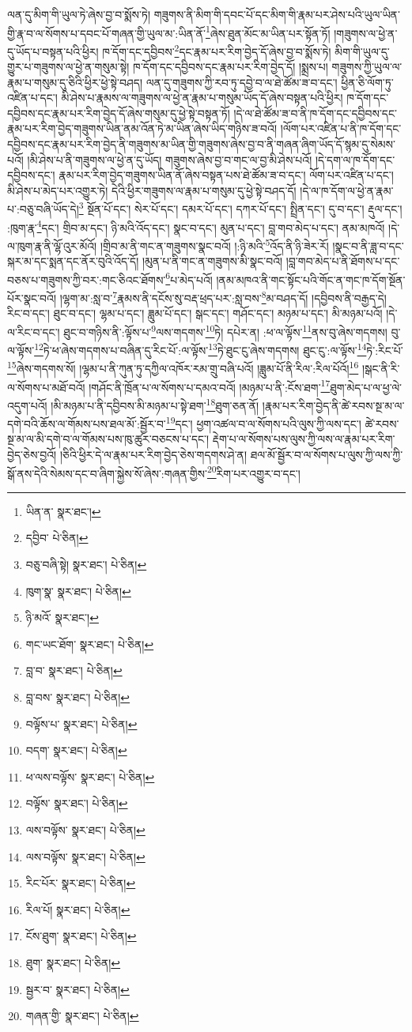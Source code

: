 ལན་དུ་མིག་གི་ཡུལ་ཏེ་ཞེས་བྱ་བ་སྨོས་ཏེ། གཟུགས་ནི་མིག་གི་དབང་པོ་དང་མིག་གི་རྣམ་པར་ཤེས་པའི་ཡུལ་ཡིན་གྱི་རྣ་བ་ལ་སོགས་པ་དབང་པོ་གཞན་གྱི་ཡུལ་མ་:ཡིན་ནོ་\footnote{ཡིན་ན་  སྣར་ཐང་། }ཞེས་ཐུན་མོང་མ་ཡིན་པར་སྟོན་ཏོ། །གཟུགས་ལ་ཕྱེ་ན་དུ་ཡོད་པ་བསྟན་པའི་ཕྱིར། ཁ་དོག་དང་དབྱིབས་\footnote{དབྱིབ་  པེ་ཅིན། }དང་རྣམ་པར་རིག་བྱེད་དོ་ཞེས་བྱ་བ་སྨོས་ཏེ། མིག་གི་ཡུལ་དུ་གྱུར་པ་གཟུགས་ལ་ཕྱེ་ན་གསུམ་སྟེ། ཁ་དོག་དང་དབྱིབས་དང་རྣམ་པར་རིག་བྱེད་དོ། །སྨྲས་པ། གཟུགས་ཀྱི་ཡུལ་ལ་རྣམ་པ་གསུམ་དུ་ཅིའི་ཕྱིར་ཕྱེ་སྟེ་བཤད། ལན་དུ་གཟུགས་ཀྱི་རབ་ཏུ་དབྱེ་བ་ལ་ཐེ་ཚོམ་ཟ་བ་དང་། ཕྱིན་ཅི་ལོག་ཏུ་འཛིན་པ་དང་། མི་ཤེས་པ་རྣམས་ལ་གཟུགས་ལ་ཕྱེ་ན་རྣམ་པ་གསུམ་ཡོད་དོ་ཞེས་བསྟན་པའི་ཕྱིར། ཁ་དོག་དང་དབྱིབས་དང་རྣམ་པར་རིག་བྱེད་དོ་ཞེས་གསུམ་དུ་ཕྱེ་སྟེ་བསྟན་ཏོ། །དེ་ལ་ཐེ་ཚོམ་ཟ་བ་ནི་ཁ་དོག་དང་དབྱིབས་དང་རྣམ་པར་རིག་བྱེད་གཟུགས་ཡིན་ནམ་འོན་ཏེ་མ་ཡིན་ཞེས་ཡིད་གཉིས་ཟ་བའོ། །ལོག་པར་འཛིན་པ་ནི་ཁ་དོག་དང་དབྱིབས་དང་རྣམ་པར་རིག་བྱེད་ནི་གཟུགས་མ་ཡིན་གྱི་གཟུགས་ཞེས་བྱ་བ་ནི་གཞན་ཞིག་ཡོད་དོ་སྙམ་དུ་སེམས་པའོ། །མི་ཤེས་པ་ནི་གཟུགས་ལ་ཕྱེ་ན་དུ་ཡོད། གཟུགས་ཞེས་བྱ་བ་གང་ལ་བྱ་མི་ཤེས་པའོ། །དེ་དག་ལ་ཁ་དོག་དང་དབྱིབས་དང་། རྣམ་པར་རིག་བྱེད་གཟུགས་ཡིན་ནོ་ཞེས་བསྟན་པས་ཐེ་ཚོམ་ཟ་བ་དང་། ལོག་པར་འཛིན་པ་དང་། མི་ཤེས་པ་མེད་པར་འགྱུར་ཏེ། དེའི་ཕྱིར་གཟུགས་ལ་རྣམ་པ་གསུམ་དུ་ཕྱེ་སྟེ་བཤད་དོ། །དེ་ལ་ཁ་དོག་ལ་ཕྱེ་ན་རྣམ་པ་:བཅུ་བཞི་ཡོད་དེ།\footnote{བཅུ་བཞི་སྟེ།  སྣར་ཐང་།  པེ་ཅིན། } སྔོན་པོ་དང་། སེར་པོ་དང་། དམར་པོ་དང་། དཀར་པོ་དང་། སྤྲིན་དང་། དུ་བ་དང་། རྡུལ་དང་། :ཁུག་རྣ་\footnote{ཁུག་སྣ་  སྣར་ཐང་།  པེ་ཅིན། }དང་། གྲིབ་མ་དང་། ཉི་མའི་འོད་དང་། སྣང་བ་དང་། མུན་པ་དང་། བླ་གབ་མེད་པ་དང་། ནམ་མཁའོ། །དེ་ལ་ཁུག་རྣ་ནི་ལྷོ་འུར་མོའོ། །གྲིབ་མ་ནི་གང་ན་གཟུགས་སྣང་བའོ། །:ཉི་མའི་\footnote{ཉི་མའོ་  སྣར་ཐང་། }འོད་ནི་ཉི་ཟེར་རོ། །སྣང་བ་ནི་ཟླ་བ་དང་སྐར་མ་དང་སྨན་དང་ནོར་བུའི་འོད་དོ། །མུན་པ་ནི་གང་ན་གཟུགས་མི་སྣང་བའོ། །བླ་གབ་མེད་པ་ནི་ཐོགས་པ་དང་བཅས་པ་གཟུགས་ཀྱི་བར་:གང་ཅིའང་ཐོགས་\footnote{གང་ཡང་ཐོག་  སྣར་ཐང་།  པེ་ཅིན། }པ་མེད་པའོ། །ནམ་མཁའ་ནི་གང་སྟོང་པའི་གོང་ན་གང་ཁ་དོག་སྔོན་པོར་སྣང་བའོ། །ལྷག་མ་:སླ་བ་\footnote{བླ་བ་  སྣར་ཐང་།  པེ་ཅིན། }རྣམས་ནི་དངོས་སུ་བརྡ་ཕྲད་པར་:སླ་བས་\footnote{བླ་བས་  སྣར་ཐང་།  པེ་ཅིན། }མ་བཤད་དོ། །དབྱིབས་ནི་བརྒྱད་དེ། རིང་བ་དང་། ཐུང་བ་དང་། ལྷམ་པ་དང་། ཟླུམ་པོ་དང་། སྒང་དང་། གཤོང་དང་། མཉམ་པ་དང་། མི་མཉམ་པའོ། །དེ་ལ་རིང་བ་དང་། ཐུང་བ་གཉིས་ནི་:ལྟོས་པ་\footnote{བལྟོས་པ་  སྣར་ཐང་།  པེ་ཅིན། }ལས་གདགས་\footnote{བདག་  སྣར་ཐང་།  པེ་ཅིན། }ཏེ། དཔེར་ན། :ཕ་ལ་ལྟོས་\footnote{ཕ་ལས་བལྟོས་  སྣར་ཐང་།  པེ་ཅིན། }ནས་བུ་ཞེས་གདགས། བུ་ལ་ལྟོས་\footnote{བལྟོས་  སྣར་ཐང་།  པེ་ཅིན། }ཏེ་ཕ་ཞེས་གདགས་པ་བཞིན་དུ་རིང་པོ་:ལ་ལྟོས་\footnote{ལས་བལྟོས་  སྣར་ཐང་།  པེ་ཅིན། }ཏེ་ཐུང་ངུ་ཞེས་གདགས། ཐུང་ངུ་:ལ་ལྟོས་\footnote{ལས་བལྟོས་  སྣར་ཐང་།  པེ་ཅིན། }ཏེ་:རིང་པོ་\footnote{རིང་པོར་  སྣར་ཐང་།  པེ་ཅིན། }ཞེས་གདགས་སོ། །ལྷམ་པ་ནི་ཀུན་ཏུ་དཀྱིལ་འཁོར་རམ་གྲུ་བཞི་པའོ། །ཟླུམ་པོ་ནི་རིལ་:རིལ་པོའོ།\footnote{རིལ་པོ།  སྣར་ཐང་།  པེ་ཅིན། } །སྒང་ནི་རི་ལ་སོགས་པ་མཐོ་བའོ། །གཤོང་ནི་ཁྲོན་པ་ལ་སོགས་པ་དམའ་བའོ། །མཉམ་པ་ནི་:ངོས་ཐག་\footnote{ངོས་ཐུག་  སྣར་ཐང་།  པེ་ཅིན། }ཐུག་མེད་པ་ལ་ཕྱ་ལེ་འདུག་པའོ། །མི་མཉམ་པ་ནི་དབྱིབས་མི་མཉམ་པ་སྟེ་ཐག་\footnote{ཐུག་  སྣར་ཐང་།  པེ་ཅིན། }ཐུག་ཅན་ནོ། །རྣམ་པར་རིག་བྱེད་ནི་ཚེ་རབས་སྔ་མ་ལ་དགེ་བའི་ཆོས་ལ་གོམས་པས་ཐལ་མོ་:སྦྱོར་བ་\footnote{སྦྱར་བ་  སྣར་ཐང་།  པེ་ཅིན། }དང་། ཕྱག་འཚལ་བ་ལ་སོགས་པའི་ལུས་ཀྱི་ལས་དང་། ཚེ་རབས་སྔ་མ་ལ་མི་དགེ་བ་ལ་གོམས་པས་ཁུ་ཚུར་བཅངས་པ་དང་། རྡེག་པ་ལ་སོགས་པས་ལུས་ཀྱི་ལས་ལ་རྣམ་པར་རིག་བྱེད་ཅེས་བྱའོ། །ཅིའི་ཕྱིར་དེ་ལ་རྣམ་པར་རིག་བྱེད་ཅེས་གདགས་ཤེ་ན། ཐལ་མོ་སྦྱོར་བ་ལ་སོགས་པ་ལུས་ཀྱི་ལས་ཀྱི་སྒོ་ནས་དེའི་སེམས་དང་བ་ཞིག་སྐྱེས་སོ་ཞེས་:གཞན་གྱིས་\footnote{གཞན་གྱི་  སྣར་ཐང་།  པེ་ཅིན། }རིག་པར་འགྱུར་བ་དང་། 